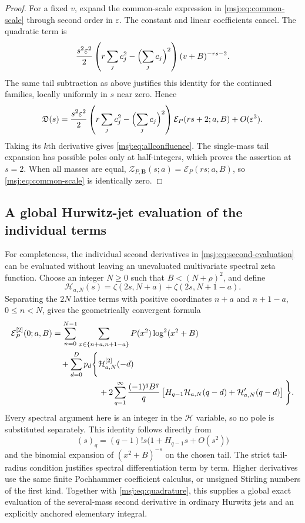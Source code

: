 \begin{proof}
For a fixed $v$, expand the common-scale expression in
\eqref{msj:eq:common-scale} through second order in $\varepsilon$.
The constant and linear coefficients cancel. The quadratic term is
\[
 \frac{s^2\varepsilon^2}{2}
 \left(r\sum_jc_j^2-\Bigl(\sum_jc_j\Bigr)^2\right)(v+B)^{-rs-2}.
\]
The same tail subtraction as above justifies this identity for the
continued families, locally uniformly in $s$ near zero. Hence
\[
 \mathfrak D(s)=\frac{s^2\varepsilon^2}{2}
 \left(r\sum_jc_j^2-\Bigl(\sum_jc_j\Bigr)^2\right)
                 \mathcal E_P(rs+2;a,B)+O(\varepsilon^3).
\]
Taking its $k$th derivative gives \eqref{msj:eq:allconfluence}.
The single-mass tail expansion has possible poles only at half-integers,
which proves the assertion at $s=2$. When all masses are equal,
$\mathcal Z_{P,\boldsymbol B}(s;a)=\mathcal E_P(rs;a,B)$, so
\eqref{msj:eq:common-scale} is identically zero.
\end{proof}

\subsection{A global Hurwitz-jet evaluation of the individual terms}

For completeness, the individual second derivatives in
\eqref{msj:eq:second-evaluation} can be evaluated without leaving an
unevaluated multivariate spectral zeta function. Choose an integer
$N\ge0$ such that $B<(N+\rho)^2$, and define
\[
 \mathcal H_{a,N}(s)=\zeta(2s,N+a)+\zeta(2s,N+1-a).
\]
Separating the $2N$ lattice terms with positive coordinates
$n+a$ and $n+1-a$, $0\le n<N$, gives the geometrically convergent
formula
\begin{align}
 \mathcal E_P^{[2]}(0;a,B)
 &=\sum_{n=0}^{N-1}\sum_{x\in\{n+a,n+1-a\}}
                         P(x^2)\log^2(x^2+B)
 \notag\\
 &\quad+\sum_{d=0}^{D}p_d\Bigg\{
    \mathcal H_{a,N}^{[2]}(-d)
 \notag\\
 &\hspace{20mm}+2\sum_{q=1}^{\infty}\frac{(-1)^qB^q}{q}
       \left[H_{q-1}\mathcal H_{a,N}(q-d)
                         +\mathcal H_{a,N}'(q-d)\right]\Bigg\}.
 \label{msj:eq:individual-second}
\end{align}
Every spectral argument here is an integer in the $\mathcal H$ variable,
so no pole is substituted separately. This identity follows directly
from
\[
 (s)_q=(q-1)!s\bigl(1+H_{q-1}s+O(s^2)\bigr)
\]
and the binomial expansion of $(x^2+B)^{-s}$ on the chosen tail.
The strict tail-radius condition justifies spectral differentiation
term by term. Higher derivatives use the same finite Pochhammer
coefficient calculus, or unsigned Stirling numbers of the first kind.
Together with \eqref{msj:eq:quadrature}, this supplies a global exact
evaluation of the several-mass second derivative in ordinary Hurwitz
jets and an explicitly anchored elementary integral.

